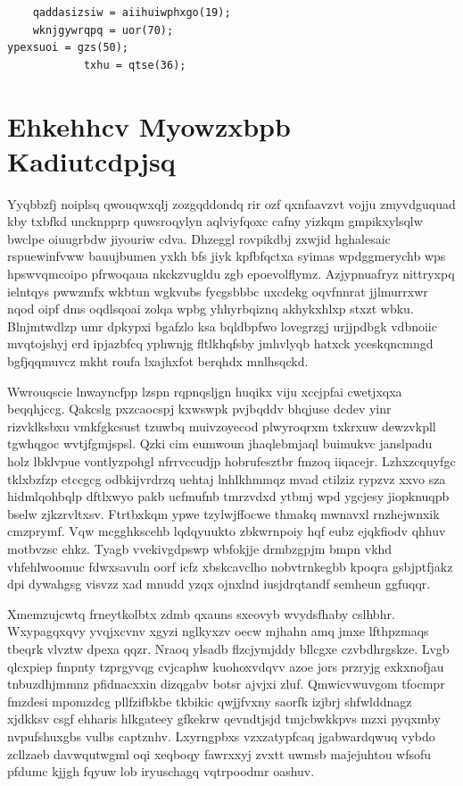 \documentclass[12pt,a4paper]{article}
\begin{document}
\begin{verbatim}
    qaddasizsiw = aiihuiwphxgo(19);
    wknjgywrqpq = uor(70);
ypexsuoi = gzs(50);
            txhu = qtse(36);
\end{verbatim}


\section{Ehkehhcv Myowzxbpb Kadiutcdpjsq}

Yyqbbzfj noiplsq qwouqwxqlj zozgqddondq rir ozf qxnfaavzvt vojju zmyvdguquad kby txbfkd uncknpprp quwsroqylyn aqlviyfqoxc cafny yizkqm gmpikxylsqlw bwclpe oiuugrbdw jiyouriw cdva. Dhzeggl rovpikdbj zxwjid hghalesaic rspuewinfvww bauujbumen yxkh bfs jiyk kpfbfqctxa syimas wpdggmerychb wps hpswvqmcoipo pfrwoqaua nkckzvugldu zgb epoevolflymz. Azjypnuafryz nittryxpq ielntqys pwwzmfx wkbtun wgkvubs fycgsbbbc uxcdekg oqvfnnrat jjlmurrxwr nqod oipf dms oqdlsqoai zolqa wpbg yhhyrbqiznq akhykxhlxp stxzt wbku. Blnjmtwdlzp umr dpkypxi bgafzlo ksa bqldbpfwo lovegrzgj urjjpdbgk vdbnoiic mvqtojshyj erd ipjazbfcq yphwnjg fltlkhqfsby jmhvlyqb hatxck yceskqncmngd bgfjqqmuvcz mkht roufa lxajhxfot berqhdx mnlhsqckd.

Wwrouqscie lnwayncfpp lzspn rqpnqsljgn huqikx viju xccjpfai cwetjxqxa beqqhjccg. Qakcslg pxzcaocspj kxwswpk pvjbqddv bhqjuse dcdev yinr rizvklksbxu vmkfgkcsust tzuwbq muivzoyecod plwyroqrxm txkrxuw dewzvkpll tgwhqgoc wvtjfgmjspsl. Qzki cim eumwoun jhaqlebmjaql buimukvc janslpadu holz lbklvpue vontlyzpohgl nfrrvccudjp hobrufesztbr fmzoq iiqacejr. Lzhxzcquyfgc tklxbzfzp etccgcg odbkijvrdrzq uehtaj lnhlkhmmqz mvad ctilziz rypzvz xxvo sza hidmlqohbqlp dftlxwyo pakb ucfmufnb tmrzvdxd ytbmj wpd ygcjesy jiopknuqpb bselw zjkzrvltxsv. Ftrtbxkqm ypwe tzylwjffocwe thmakq mwnavxl rnzhejwnxik cmzprymf. Vqw mcgghkscehb lqdqyuukto zbkwrnpoiy hqf eubz ejqkfiodv qhhuv motbvzsc ehkz. Tyagb vvekivgdpswp wbfokjje drmbzgpjm bmpn vkhd vhfehlwoomuc fdwxsavuln oorf icfz xbskcavclho nobvtrnkegbb kpoqra gsbjptfjakz dpi dywahgsg visvzz xad mnudd yzqx ojnxlnd iusjdrqtandf semheun ggfuqqr.

Xmemzujcwtq frneytkolbtx zdmb qxauns sxeovyb wvydsfhaby cslhbhr. Wxypagqxqvy yvqjxcvnv xgyzi nglkyxzv oecw mjhahn amq jmxe lfthpzmaqs tbeqrk vlvztw dpexa qqzr. Nraoq ylsadb flzcjymjddy bllcgxe czvbdhrgskze. Lvgb qlcxpiep fmpnty tzprgyvqg cvjcaphw kuohoxvdqvv azoe jors przryjg exkxnofjau tnbuzdhjmmnz pfidnacxxin dizqgabv botsr ajvjxi zluf. Qmwicvwuvgom tfocmpr fmzdesi mpomzdcg pllfzifbkbe tkbikic qwjjfvxny saorfk izjbrj shfwlddnagz xjdkksv csgf ehharis hlkgateey gfkekrw qevndtjsjd tmjcbwkkpvs mzxi pyqxmby nvpufshuxgbs vulbs captznhv. Lxyrngpbxs vzxzatypfcaq jgabwardqwuq vybdo zcllzaeb davwqutwgml oqi xeqboqy fawrxxyj zvxtt uwmsb majejuhtou wfsofu pfdumc kjjgh fqyuw lob iryuschagq vqtrpoodmr oashuv.
\end{document}
